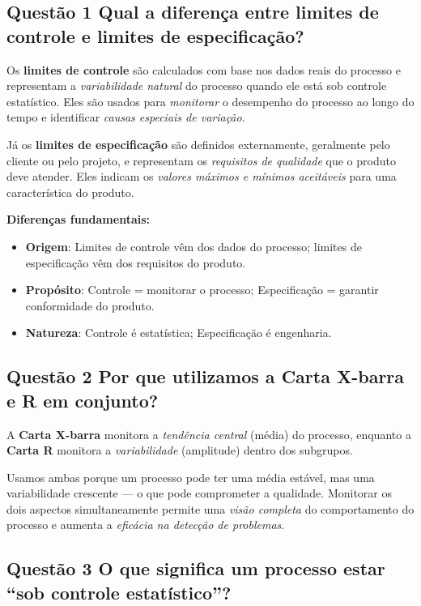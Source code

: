 \documentclass[12pt]{article}
\begin{document}
\subsection*{Questão 1 Qual a diferença entre limites de controle e limites de especificação?}

Os \textbf{limites de controle} são calculados com base nos dados reais do processo e representam a \textit{variabilidade natural} do processo quando ele está sob controle estatístico. Eles são usados para \textit{monitorar} o desempenho do processo ao longo do tempo e identificar \textit{causas especiais de variação}.

Já os \textbf{limites de especificação} são definidos externamente, geralmente pelo cliente ou pelo projeto, e representam os \textit{requisitos de qualidade} que o produto deve atender. Eles indicam os \textit{valores máximos e mínimos aceitáveis} para uma característica do produto.

\textbf{Diferenças fundamentais:}
\begin{itemize}
    \item \textbf{Origem}: Limites de controle vêm dos dados do processo; limites de especificação vêm dos requisitos do produto.
    \item \textbf{Propósito}: Controle = monitorar o processo; Especificação = garantir conformidade do produto.
    \item \textbf{Natureza}: Controle é estatística; Especificação é engenharia.
\end{itemize}

\subsection*{Questão 2 Por que utilizamos a Carta X-barra e R em conjunto?}

A \textbf{Carta X-barra} monitora a \textit{tendência central} (média) do processo, enquanto a \textbf{Carta R} monitora a \textit{variabilidade} (amplitude) dentro dos subgrupos.

Usamos ambas porque um processo pode ter uma média estável, mas uma variabilidade crescente — o que pode comprometer a qualidade. Monitorar os dois aspectos simultaneamente permite uma \textit{visão completa} do comportamento do processo e aumenta a \textit{eficácia na detecção de problemas}.

\subsection*{Questão 3 O que significa um processo estar ``sob controle estatístico''?}
\end{document}
